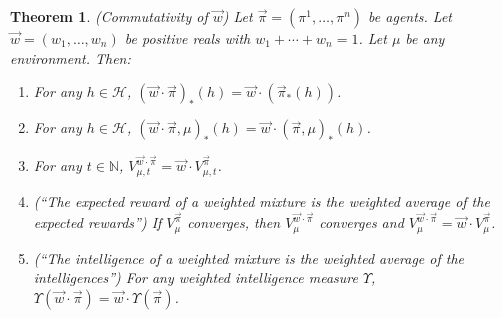 \documentclass{article}
\newtheorem{theorem}{Theorem}
\begin{document}
\begin{theorem}
\label{maintheorem}
    (Commutativity of $\vec w$)
    Let $\vec\pi=(\pi^1,\ldots,\pi^n)$ be agents.
    Let $\vec w=(w_1,\ldots,w_n)$ be positive reals with
    $w_1+\cdots+w_n=1$. Let $\mu$ be any environment.
    Then:
    \begin{enumerate}
        \item
        For any $h\in\mathcal H$,
        $(\vec w\cdot\vec\pi)_*(h)=\vec w\cdot(\vec\pi_*(h))$.
        \item
        For any $h\in\mathcal H$,
        $(\vec w\cdot \vec\pi,\mu)_*(h)=\vec w\cdot(\vec\pi,\mu)_*(h)$.
        \item
        For any $t\in\mathbb N$,
        $V^{\vec w\cdot \vec\pi}_{\mu,t}=\vec w\cdot V^{\vec\pi}_{\mu,t}$.
        \item
        (``The expected reward of a weighted mixture is the weighted
        average of the expected rewards'')
        If $V^{\vec\pi}_\mu$ converges, then $V^{\vec w\cdot\vec\pi}_\mu$
        converges and $V^{\vec w\cdot\vec\pi}_\mu=\vec w\cdot V^{\vec\pi}_\mu$.
        \item
        (``The intelligence of a weighted mixture is the weighted average
        of the intelligences'')
        For any weighted intelligence measure $\Upsilon$,
        $\Upsilon(\vec w\cdot\vec\pi)=\vec w\cdot\Upsilon(\vec\pi)$.
    \end{enumerate}
\end{theorem}
\end{document}
